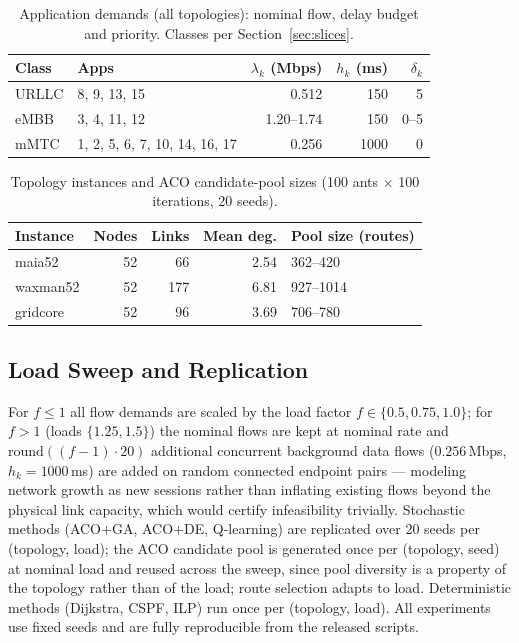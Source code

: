 \documentclass[journal]{IEEEtran}
\begin{document}
\begin{table}[!t]
\caption{Application demands (all topologies): nominal flow, delay budget
and priority. Classes per Section~\ref{sec:slices}.}
\label{tab:apps}
\centering
\begin{tabular}{@{}llrrr@{}}
\toprule
Class & Apps & $\lambda_k$ (Mbps) & $h_k$ (ms) & $\delta_k$\\
\midrule
URLLC & 8, 9, 13, 15 & 0.512 & 150 & 5\\
eMBB  & 3, 4, 11, 12  & 1.20--1.74 & 150 & 0--5\\
mMTC  & 1, 2, 5, 6, 7, 10, 14, 16, 17 & 0.256 & 1000 & 0\\
\bottomrule
\end{tabular}
\end{table}

\begin{table}[!t]
\caption{Topology instances and ACO candidate-pool sizes (100 ants
$\times$ 100 iterations, 20 seeds).}
\label{tab:topo}
\centering
\begin{tabular}{@{}lrrrl@{}}
\toprule
Instance & Nodes & Links & Mean deg. & Pool size (routes)\\
\midrule
maia52 & 52 & 66 & 2.54 & 362--420\\
waxman52 & 52 & 177 & 6.81 & 927--1014\\
gridcore & 52 & 96 & 3.69 & 706--780\\
\bottomrule
\end{tabular}
\end{table}

\subsection{Load Sweep and Replication}
For $f\le 1$ all flow demands are scaled by the load factor
$f\in\{0.5, 0.75, 1.0\}$; for $f>1$ (loads $\{1.25, 1.5\}$) the nominal
flows are kept at nominal rate and
$\mathrm{round}((f{-}1)\!\cdot\!20)$ additional concurrent background data
flows ($0.256$\,Mbps, $h_k{=}1000$\,ms) are added on random connected
endpoint pairs --- modeling network growth as new sessions rather than
inflating existing flows beyond the physical link capacity, which would
certify infeasibility trivially. Stochastic methods (ACO$+$GA,
ACO$+$DE, Q-learning) are replicated over $20$ seeds per (topology, load);
the ACO candidate pool is generated once per (topology, seed) at nominal
load and reused across the sweep, since pool diversity is a property of the
topology rather than of the load; route selection adapts to load.
Deterministic methods (Dijkstra, CSPF, ILP) run once per (topology, load).
All experiments use fixed seeds and are fully reproducible from the released
scripts.
\end{document}
